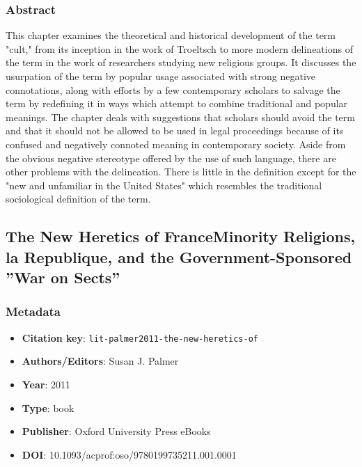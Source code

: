 \subsubsection*{Abstract}
This chapter examines the theoretical and historical development of the term "cult," from its inception in the work of Troeltsch to more modern delineations of the term in the work of researchers studying new religious groups. It discusses the usurpation of the term by popular usage associated with strong negative connotations, along with efforts by a few contemporary scholars to salvage the term by redefining it in ways which attempt to combine traditional and popular meanings. The chapter deals with suggestions that scholars should avoid the term and that it should not be allowed to be used in legal proceedings because of its confused and negatively connoted meaning in contemporary society. Aside from the obvious negative stereotype offered by the use of such language, there are other problems with the delineation. There is little in the definition except for the "new and unfamiliar in the United States" which resembles the traditional sociological definition of the term.

\subsection{The New Heretics of FranceMinority Religions, la Republique, and the Government-Sponsored ''War on Sects''}\label{lit:lit-palmer2011-the-new-heretics-of}
\subsubsection*{Metadata}
\begin{itemize}
  \item \textbf{Citation key}: \texttt{lit-palmer2011-the-new-heretics-of}
  \item \textbf{Authors/Editors}: Susan J. Palmer
  \item \textbf{Year}: 2011
  \item \textbf{Type}: book
  \item \textbf{Publisher}: Oxford University Press eBooks
  \item \textbf{DOI}: 10.1093/acprof:oso/9780199735211.001.0001
\end{itemize}
